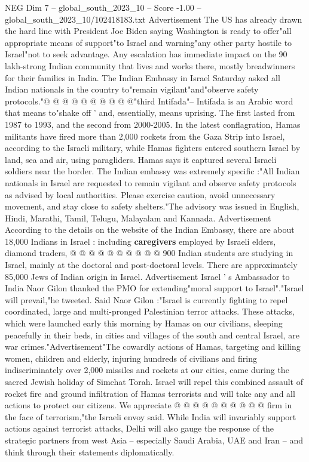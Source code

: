 \begin{textsample}{NEG Dim 7 – global\_south\_2023\_10 – Score -1.00 – global\_south\_2023\_10/102418183.txt}
Advertisement The US has already drawn the hard line with President Joe Biden saying Washington is ready to offer"all appropriate means of support"to Israel and warning"any other party hostile to Israel"not to seek advantage.
Any escalation has immediate impact on the 90 lakh-strong Indian community that lives and works there, mostly breadwinners for their families in India.
The Indian Embassy in Israel Saturday asked all Indian nationals in the country to"remain vigilant"and"observe safety protocols."@ @ @ @ @ @ @ @ @ @"third Intifada"-- Intifada is an Arabic word that means to"shake off ' and, essentially, means uprising.
The first lasted from 1987 to 1993, and the second from 2000-2005.
In the latest conflagration, Hamas militants have fired more than 2,000 rockets from the Gaza Strip into Israel, according to the Israeli military, while Hamas fighters entered southern Israel by land, sea and air, using paragliders.
Hamas says it captured several Israeli soldiers near the border.
The Indian embassy was extremely specific :"All Indian nationals in Israel are requested to remain vigilant and observe safety protocols as advised by local authorities.
Please exercise caution, avoid unnecessary movement, and stay close to safety shelters."The advisory was issued in English, Hindi, Marathi, Tamil, Telugu, Malayalam and Kannada.
Advertisement According to the details on the website of the Indian Embassy, there are about 18,000 Indians in Israel : including \textbf{caregivers} employed by Israeli elders, diamond traders, @ @ @ @ @ @ @ @ @ @ 900 Indian students are studying in Israel, mainly at the doctoral and post-doctoral levels.
There are approximately 85,000 Jews of Indian origin in Israel.
Advertisement Israel ' s Ambassador to India Naor Gilon thanked the PMO for extending"moral support to Israel"."Israel will prevail,"he tweeted.
Said Naor Gilon :"Israel is currently fighting to repel coordinated, large and multi-pronged Palestinian terror attacks.
These attacks, which were launched early this morning by Hamas on our civilians, sleeping peacefully in their beds, in cities and villages of the south and central Israel, are war crimes."Advertisement"The cowardly actions of Hamas, targeting and killing women, children and elderly, injuring hundreds of civilians and firing indiscriminately over 2,000 missiles and rockets at our cities, came during the sacred Jewish holiday of Simchat Torah.
Israel will repel this combined assault of rocket fire and ground infiltration of Hamas terrorists and will take any and all actions to protect our citizens.
We appreciate @ @ @ @ @ @ @ @ @ @ firm in the face of terrorism,"the Israeli envoy said.
While India will invariably support actions against terrorist attacks, Delhi will also gauge the response of the strategic partners from west Asia -- especially Saudi Arabia, UAE and Iran -- and think through their statements diplomatically.

\end{textsample}
